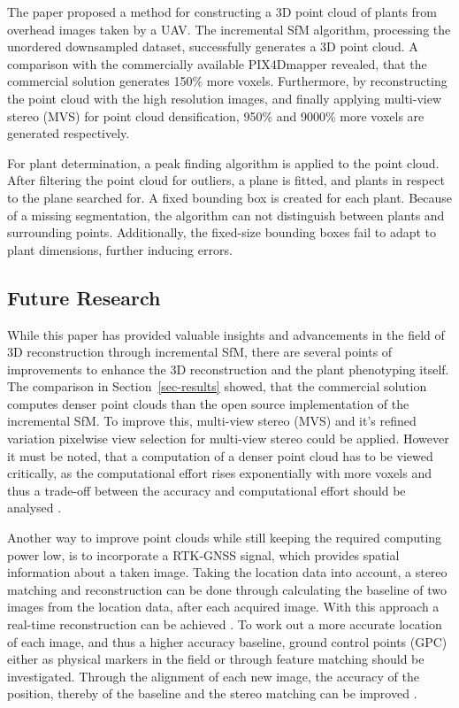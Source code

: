\documentclass[conference,]{IEEEtran}
\begin{document}
The paper proposed a method for constructing a 3D point cloud of plants
from overhead images taken by a UAV. The incremental SfM algorithm,
processing the unordered downsampled dataset, successfully generates a
3D point cloud. A comparison with the commercially available PIX4Dmapper
revealed, that the commercial solution generates 150\% more voxels.
Furthermore, by reconstructing the point cloud with the high resolution
images, and finally applying multi-view stereo (MVS) for point cloud
densification, 950\% and 9000\% more voxels are generated respectively.

For plant determination, a peak finding algorithm is applied to the
point cloud. After filtering the point cloud for outliers, a plane is
fitted, and plants in respect to the plane searched for. A fixed
bounding box is created for each plant. Because of a missing
segmentation, the algorithm can not distinguish between plants and
surrounding points. Additionally, the fixed-size bounding boxes fail to
adapt to plant dimensions, further inducing errors.

\hypertarget{future-research}{%
\subsection{Future Research}\label{future-research}}

While this paper has provided valuable insights and advancements in the
field of 3D reconstruction through incremental SfM, there are several
points of improvements to enhance the 3D reconstruction and the plant
phenotyping itself. The comparison in Section~\ref{sec-results} showed,
that the commercial solution computes denser point clouds than the open
source implementation of the incremental SfM. To improve this,
multi-view stereo (MVS) \autocite{bailer2012} and it's refined variation
pixelwise view selection for multi-view stereo
\autocite{schönberger2016a} could be applied. However it must be noted,
that a computation of a denser point cloud has to be viewed critically,
as the computational effort rises exponentially with more voxels and
thus a trade-off between the accuracy and computational effort should be
analysed \autocite{paulus2019,li2022}.

Another way to improve point clouds while still keeping the required
computing power low, is to incorporate a RTK-GNSS signal, which provides
spatial information about a taken image. Taking the location data into
account, a stereo matching and reconstruction can be done through
calculating the baseline of two images from the location data, after
each acquired image. With this approach a real-time reconstruction can
be achieved \autocite{hasheminasab2020,matsuura2023}. To work out a more
accurate location of each image, and thus a higher accuracy baseline,
ground control points (GPC) either as physical markers in the field or
through feature matching should be investigated. Through the alignment
of each new image, the accuracy of the position, thereby of the baseline
and the stereo matching can be improved \autocite{feng2023}.
\end{document}

